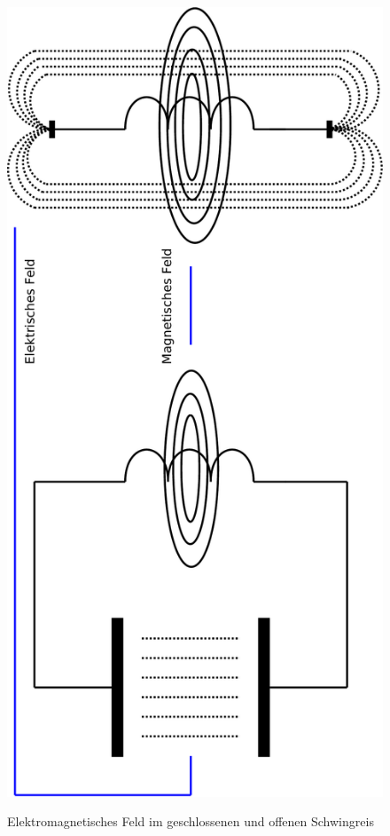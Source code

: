 \begin{frame}
    \centering
    \begin{figure}
    \includegraphics[width=\textwidth,height=1.5\textheight,keepaspectratio,angle=270]{e08/AntSchwingkreis-crop.pdf}\\[1em]
    \caption{Elektromagnetisches Feld im geschlossenen und offenen Schwingreis}
  \end{figure}
\end{frame}


